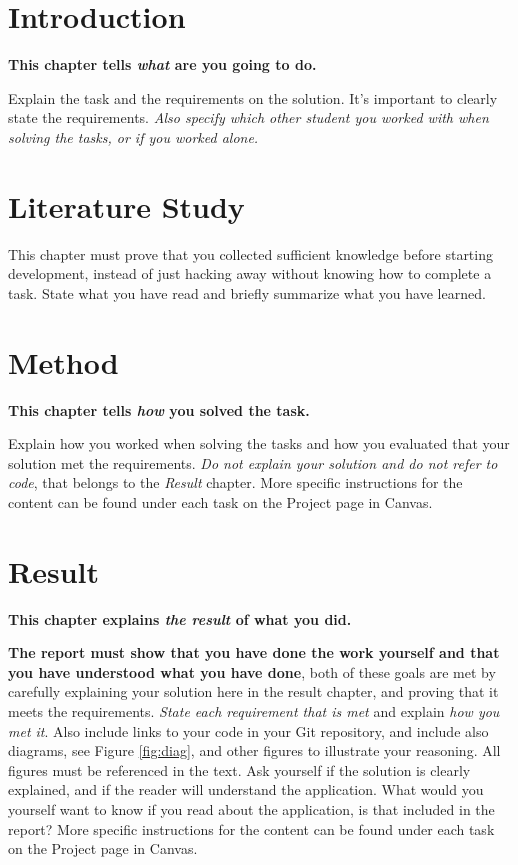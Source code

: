 \documentclass[a4paper]{scrartcl}
\begin{document}
\section{Introduction}

\textbf{This chapter tells \textit{what} are you going to do.} 

Explain the task and the requirements on the solution. It's important to clearly state the requirements. \textit{Also specify which other student you worked with when solving the tasks, or if you worked alone.} 

\section{Literature Study}

This chapter must prove that you collected sufficient knowledge before starting development, instead of just hacking away without knowing how to complete a task. State what you have read and briefly summarize what you have learned.

\section{Method}

\textbf{This chapter tells \textit{how} you solved the task.}

Explain how you worked when solving the tasks and how you evaluated that your solution met the requirements. \textit{Do not explain your solution and do not refer to code}, that belongs to the \textit{Result} chapter. More specific instructions for the content can be found under each task on the Project page in Canvas.

\section{Result}

\textbf{This chapter explains \textit{the result} of what you did.}

\textbf{The report must show that you have done the work yourself and that you have understood what you have done}, both of these goals are met by carefully explaining your solution here in the result chapter, and proving that it meets the requirements. \textit{State each requirement that is met} and explain \textit{how you met it}. Also include links to your code in your Git repository, and include also diagrams, see Figure \ref{fig:diag}, and other figures to illustrate your reasoning. All figures must be referenced in the text. Ask yourself if the solution is clearly explained, and if the reader will understand the application. What would you yourself want to know if you read about the application, is that included in the report? More specific instructions for the content can be found under each task on the Project page in Canvas. 
\end{document}

